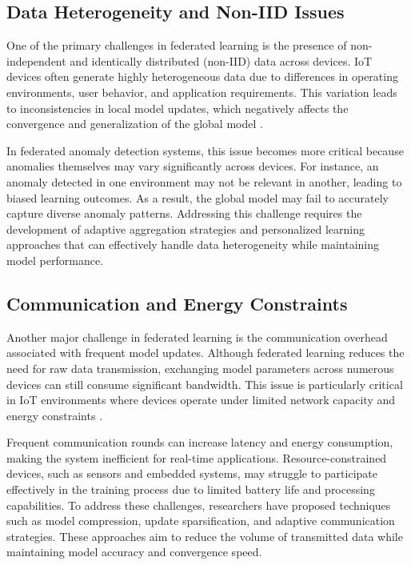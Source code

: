 \documentclass[12pt]{article}
\begin{document}
\subsection{Data Heterogeneity and Non-IID Issues}

One of the primary challenges in federated learning is the presence of non-independent and identically distributed (non-IID) data across devices. IoT devices often generate highly heterogeneous data due to differences in operating environments, user behavior, and application requirements. This variation leads to inconsistencies in local model updates, which negatively affects the convergence and generalization of the global model \cite{paper1,paper2}.

In federated anomaly detection systems, this issue becomes more critical because anomalies themselves may vary significantly across devices. For instance, an anomaly detected in one environment may not be relevant in another, leading to biased learning outcomes. As a result, the global model may fail to accurately capture diverse anomaly patterns. Addressing this challenge requires the development of adaptive aggregation strategies and personalized learning approaches that can effectively handle data heterogeneity while maintaining model performance.

\subsection{Communication and Energy Constraints}

Another major challenge in federated learning is the communication overhead associated with frequent model updates. Although federated learning reduces the need for raw data transmission, exchanging model parameters across numerous devices can still consume significant bandwidth. This issue is particularly critical in IoT environments where devices operate under limited network capacity and energy constraints \cite{paper3,paper4}.

Frequent communication rounds can increase latency and energy consumption, making the system inefficient for real-time applications. Resource-constrained devices, such as sensors and embedded systems, may struggle to participate effectively in the training process due to limited battery life and processing capabilities. To address these challenges, researchers have proposed techniques such as model compression, update sparsification, and adaptive communication strategies. These approaches aim to reduce the volume of transmitted data while maintaining model accuracy and convergence speed.
\end{document}
